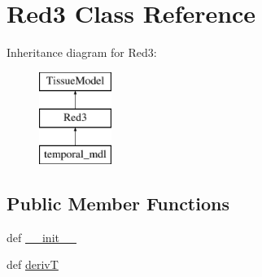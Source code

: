 \hypertarget{classcell__mdl2_1_1_red3}{
\section{Red3 Class Reference}
\label{classcell__mdl2_1_1_red3}
}
Inheritance diagram for Red3:\begin{figure}[H]
\begin{center}
\leavevmode
\includegraphics[height=3cm]{classcell__mdl2_1_1_red3}
\end{center}
\end{figure}
\subsection*{Public Member Functions}
\begin{DoxyCompactItemize}
\item 
def \hyperlink{classcell__mdl2_1_1_red3_ac775ee34451fdfa742b318538164070e}{\_\-\_\-init\_\-\_\-}
\item 
def \hyperlink{classcell__mdl2_1_1_red3_ad67701a6bb599a16a9eb386aa1cd4328}{derivT}
\end{DoxyCompactItemize}
